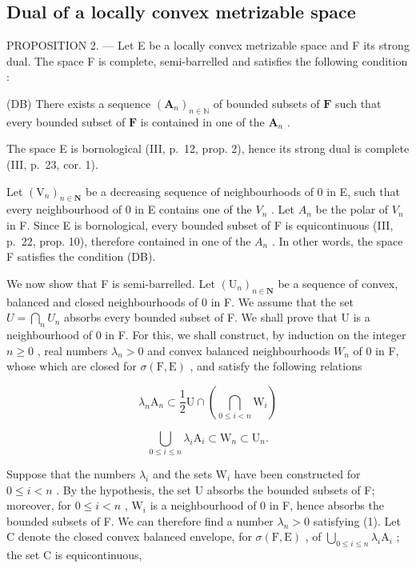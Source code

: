 \subsection{Dual of a locally convex metrizable space}

PROPOSITION 2. --- Let E be a locally convex metrizable space and F its strong dual. The space F is complete, semi-barrelled and satisfies the following condition :

(DB) There exists a sequence \((\mathbf{A}_n)_{n\in \mathbb{N}}\) of bounded subsets of \(\mathbf{F}\) such that every bounded subset of \(\mathbf{F}\) is contained in one of the \(\mathbf{A}_n\) .

The space E is bornological (III, p.~12, prop. 2), hence its strong dual is complete (III, p.~23, cor. 1).

Let \((\mathrm{V}_{n})_{n\in\mathbf{N}}\) be a decreasing sequence of neighbourhoods of 0 in E, such that every neighbourhood of 0 in E contains one of the \(V_{n}\) . Let \(A_{n}\) be the polar of \(V_{n}\) in F. Since E is bornological, every bounded subset of F is equicontinuous (III, p.~22, prop. 10), therefore contained in one of the \(A_{n}\) . In other words, the space F satisfies the condition (DB).

We now show that F is semi-barrelled. Let \((\mathrm{U}_{n})_{n\in\mathbf{N}}\) be a sequence of convex, balanced and closed neighbourhoods of 0 in F. We assume that the set \(U=\bigcap_{n}U_{n}\) absorbs every bounded subset of F. We shall prove that U is a neighbourhood of 0 in F. For this, we shall construct, by induction on the integer \(n\geqslant0\) , real numbers \(\lambda_{n}>0\) and convex balanced neighbourhoods \(W_{n}\) of 0 in F, whose which are closed for \(\sigma(\mathrm{F},\mathrm{E})\) , and satisfy the following relations

\[
\lambda_ {n} \mathrm{A} _ {n} \subset \frac {1}{2} \mathrm{U} \cap \left(\bigcap_ {0 \leqslant i <   n} \mathrm{W} _ {i}\right)\tag{1}
\]

\[
\bigcup_ {0 \leqslant i \leqslant n} \lambda_ {i} \mathrm{A} _ {i} \subset \mathrm{W} _ {n} \subset \mathrm{U} _ {n}.\tag{2}
\]

Suppose that the numbers \(\lambda_{i}\) and the sets \(\mathrm{W}_i\) have been constructed for \(0 \leqslant i < n\) . By the hypothesis, the set U absorbs the bounded subsets of F; moreover, for \(0 \leqslant i < n\) , \(\mathrm{W}_i\) is a neighbourhood of 0 in F, hence absorbs the bounded subsets of F. We can therefore find a number \(\lambda_{n} > 0\) satisfying (1). Let C denote the closed convex balanced envelope, for \(\sigma(\mathrm{F}, \mathrm{E})\) , of \(\bigcup_{0 \leqslant i \leqslant n} \lambda_i \mathrm{A}_i\) ; the set C is equicontinuous,

